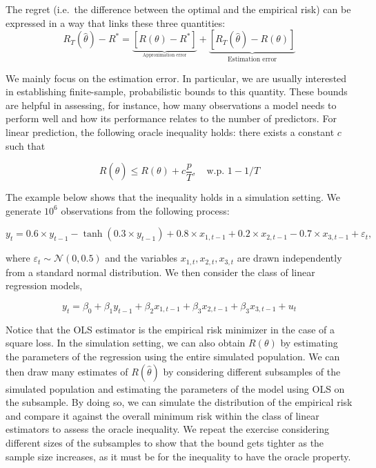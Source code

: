\documentclass[
]{book}
\begin{document}
The regret (i.e.~the difference between the optimal and the empirical risk) can be expressed in a way that links these three quantities:
\[
 R_T(\hat\theta) - R^*  = \underbrace{\left[ R(\theta) - R^* \right]}_{_{\text{Approximation error}}} + \underbrace{\left[R_T(\hat\theta) - R(\theta)\right]}_{\text{Estimation error}}
 \]

We mainly focus on the estimation error. In particular, we are usually interested in establishing finite-sample, probabilistic bounds to this quantity. These bounds are helpful in assessing, for instance, how many observations a model needs to perform well and how its performance relates to the number of predictors. For linear prediction, the following oracle inequality holds: there exists a constant \(c\) such that

\[
R(\hat\theta) \leq R(\theta) + c \frac{p}{T}, \quad \text{w.p. } 1-1/T 
\]

The example below shows that the inequality holds in a simulation setting. We generate \(10^6\) observations from the following process:

\[
y_t = 0.6\times y_{t-1} - \tanh(0.3 \times y_{t-1}) + 
              0.8\times x_{1,t-1} + 0.2 \times x_{2,t-1} -
              0.7\times x_{3,t-1} + \varepsilon_t, 
\]

where \(\varepsilon_t \sim \mathcal{N}(0, 0.5)\) and the variables \(x_{1,t}, x_{2,t}, x_{3,t}\) are drawn independently from a standard normal distribution. We then consider the class of linear regression models,

\[
y_t = \beta_0 + \beta_1 y_{t-1} + \beta_2 x_{1,t-1} + \beta_3 x_{2,t-1} + \beta_3 x_{3,t-1} + u_t
\]

Notice that the OLS estimator is the empirical risk minimizer in the case of a square loss. In the simulation setting, we can also obtain \(R(\theta)\) by estimating the parameters of the regression using the entire simulated population. We can then draw many estimates of \(R(\hat\theta)\) by considering different subsamples of the simulated population and estimating the parameters of the model using OLS on the subsample. By doing so, we can simulate the distribution of the empirical risk and compare it against the overall minimum risk within the class of linear estimators to assess the oracle inequality. We repeat the exercise considering different sizes of the subsamples to show that the bound gets tighter as the sample size increases, as it must be for the inequality to have the oracle property.
\end{document}
